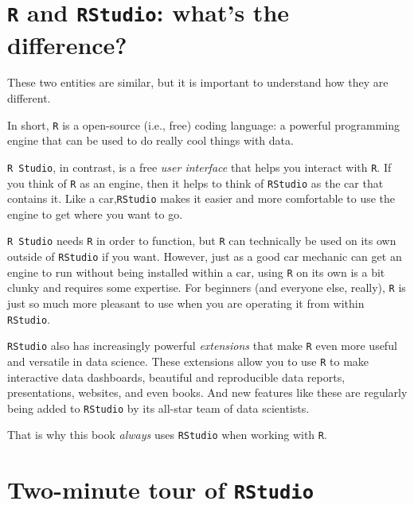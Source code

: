 \documentclass[
]{book}
\begin{document}
\hypertarget{r-and-rstudio-whats-the-difference}{%
\section*{\texorpdfstring{\texttt{R} and \texttt{RStudio}: what's the difference?}{R and RStudio: what's the difference?}}\label{r-and-rstudio-whats-the-difference}}

These two entities are similar, but it is important to understand how they are different.

In short, \texttt{R} is a open-source (i.e., free) coding language: a powerful programming engine that can be used to do really cool things with data.

\texttt{R\ Studio}, in contrast, is a free \emph{user interface} that helps you interact with \texttt{R}. If you think of \texttt{R} as an engine, then it helps to think of \texttt{RStudio} as the car that contains it. Like a car,\texttt{RStudio} makes it easier and more comfortable to use the engine to get where you want to go.

\texttt{R\ Studio} needs \texttt{R} in order to function, but \texttt{R} can technically be used on its own outside of \texttt{RStudio} if you want. However, just as a good car mechanic can get an engine to run without being installed within a car, using \texttt{R} on its own is a bit clunky and requires some expertise. For beginners (and everyone else, really), \texttt{R} is just so much more pleasant to use when you are operating it from within \texttt{RStudio}.

\texttt{RStudio} also has increasingly powerful \emph{extensions} that make \texttt{R} even more useful and versatile in data science. These extensions allow you to use \texttt{R} to make interactive data dashboards, beautiful and reproducible data reports, presentations, websites, and even books. And new features like these are regularly being added to \texttt{RStudio} by its all-star team of data scientists.

That is why this book \emph{always} uses \texttt{RStudio} when working with \texttt{R}.

\hypertarget{two-minute-tour-of-rstudio}{%
\section*{\texorpdfstring{Two-minute tour of \texttt{RStudio}}{Two-minute tour of RStudio}}\label{two-minute-tour-of-rstudio}}
\end{document}
